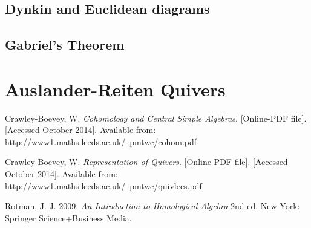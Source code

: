 \documentclass[11.5pt, twoside, a4paper, titlepage]{report}
\theoremstyle{definition}
\theoremstyle{plain}
\begin{document}
\section{Dynkin and Euclidean diagrams}

\section{Gabriel's Theorem}

\chapter{Auslander-Reiten Quivers}














\begin{thebibliography}{99}

Crawley-Boevey, W.
\emph{Cohomology and Central Simple Algebras}. [Online-PDF file]. [Accessed October 2014].
Available from: http://www1.maths.leeds.ac.uk/~pmtwc/cohom.pdf

Crawley-Boevey, W.
\emph{Representation of Quivers}. [Online-PDF file]. [Accessed October 2014].
Available from: http://www1.maths.leeds.ac.uk/~pmtwc/quivlecs.pdf

Rotman, J. J.
2009.
\emph{An Introduction to Homological Algebra}
2nd ed.
New York: Springer Science+Business Media.



\end{thebibliography}
\end{document}
